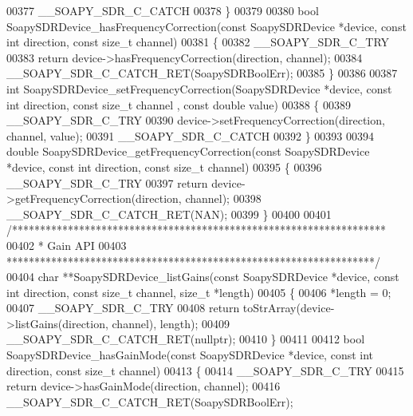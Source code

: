 \begin{DoxyCode}
00377     __SOAPY_SDR_C_CATCH
00378 \}
00379 
00380 \textcolor{keywordtype}{bool} SoapySDRDevice_hasFrequencyCorrection(\textcolor{keyword}{const} SoapySDRDevice *device, \textcolor{keyword}{const} \textcolor{keywordtype}{int} direction, \textcolor{keyword}{const} \textcolor{keywordtype}{size\_t} 
      channel)
00381 \{
00382     __SOAPY_SDR_C_TRY
00383     \textcolor{keywordflow}{return} device->hasFrequencyCorrection(direction, channel);
00384     __SOAPY_SDR_C_CATCH_RET(SoapySDRBoolErr);
00385 \}
00386 
00387 \textcolor{keywordtype}{int} SoapySDRDevice_setFrequencyCorrection(SoapySDRDevice *device, \textcolor{keyword}{const} \textcolor{keywordtype}{int} direction, \textcolor{keyword}{const} \textcolor{keywordtype}{size\_t} channel
      , \textcolor{keyword}{const} \textcolor{keywordtype}{double} value)
00388 \{
00389     __SOAPY_SDR_C_TRY
00390     device->setFrequencyCorrection(direction, channel, value);
00391     __SOAPY_SDR_C_CATCH
00392 \}
00393 
00394 \textcolor{keywordtype}{double} SoapySDRDevice_getFrequencyCorrection(\textcolor{keyword}{const} SoapySDRDevice *device, \textcolor{keyword}{const} \textcolor{keywordtype}{int} direction, \textcolor{keyword}{const} \textcolor{keywordtype}{
      size\_t} channel)
00395 \{
00396     __SOAPY_SDR_C_TRY
00397     \textcolor{keywordflow}{return} device->getFrequencyCorrection(direction, channel);
00398     __SOAPY_SDR_C_CATCH_RET(NAN);
00399 \}
00400 
00401 \textcolor{comment}{/*******************************************************************}
00402 \textcolor{comment}{ * Gain API}
00403 \textcolor{comment}{ ******************************************************************/}
00404 \textcolor{keywordtype}{char} **SoapySDRDevice_listGains(\textcolor{keyword}{const} SoapySDRDevice *device, \textcolor{keyword}{const} \textcolor{keywordtype}{int} direction, \textcolor{keyword}{const} \textcolor{keywordtype}{size\_t} channel, \textcolor{keywordtype}{
      size\_t} *length)
00405 \{
00406     *length = 0;
00407     __SOAPY_SDR_C_TRY
00408     \textcolor{keywordflow}{return} toStrArray(device->listGains(direction, channel), length);
00409     __SOAPY_SDR_C_CATCH_RET(\textcolor{keyword}{nullptr});
00410 \}
00411 
00412 \textcolor{keywordtype}{bool} SoapySDRDevice_hasGainMode(\textcolor{keyword}{const} SoapySDRDevice *device, \textcolor{keyword}{const} \textcolor{keywordtype}{int} direction, \textcolor{keyword}{const} \textcolor{keywordtype}{size\_t} channel)
00413 \{
00414     __SOAPY_SDR_C_TRY
00415     \textcolor{keywordflow}{return} device->hasGainMode(direction, channel);
00416     __SOAPY_SDR_C_CATCH_RET(SoapySDRBoolErr);

\end{DoxyCode}
